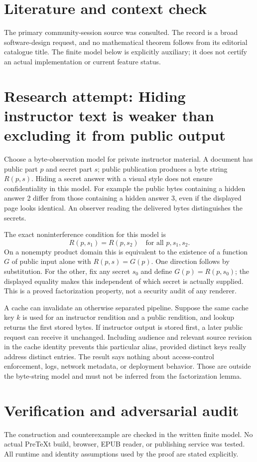 \documentclass[11pt]{article}
\begin{document}
\section{Literature and context check}
The primary community-session source was consulted. The record is a broad software-design request, and no mathematical theorem follows from its editorial catalogue title. The finite model below is explicitly auxiliary; it does not certify an actual implementation or current feature status.
\section{Research attempt: Hiding instructor text is weaker than excluding it from public output}
Choose a byte-observation model for private instructor material. A document has public part $p$ and secret part $s$; public publication produces a byte string $R(p,s)$. Hiding a secret answer with a visual style does not ensure confidentiality in this model. For example the public bytes containing a hidden answer 2 differ from those containing a hidden answer 3, even if the displayed page looks identical. An observer reading the delivered bytes distinguishes the secrets.

The exact noninterference condition for this model is
\[
R(p,s_1)=R(p,s_2)\quad\text{for all }p,s_1,s_2.
\]
On a nonempty product domain this is equivalent to the existence of a function $G$ of public input alone with $R(p,s)=G(p)$. One direction follows by substitution. For the other, fix any secret $s_0$ and define $G(p)=R(p,s_0)$; the displayed equality makes this independent of which secret is actually supplied. This is a proved factorization property, not a security audit of any renderer.

A cache can invalidate an otherwise separated pipeline. Suppose the same cache key $k$ is used for an instructor rendition and a public rendition, and lookup returns the first stored bytes. If instructor output is stored first, a later public request can receive it unchanged. Including audience and relevant source revision in the cache identity prevents this particular alias, provided distinct keys really address distinct entries. The result says nothing about access-control enforcement, logs, network metadata, or deployment behavior. Those are outside the byte-string model and must not be inferred from the factorization lemma.
\section{Verification and adversarial audit}
The construction and counterexample are checked in the written finite model. No actual PreTeXt build, browser, EPUB reader, or publishing service was tested. All runtime and identity assumptions used by the proof are stated explicitly.
\end{document}
